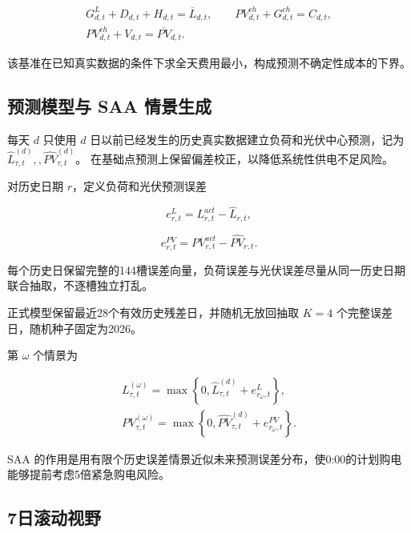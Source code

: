 \begin{equation}
\begin{gathered}
G^L_{d,t}+D_{d,t}+H_{d,t}=\overline L_{d,t},
\qquad
PV^{ch}_{d,t}+G^{ch}_{d,t}=C_{d,t},\\
PV^{ch}_{d,t}+V_{d,t}=\overline{PV}_{d,t}.
\end{gathered}
\end{equation}

该基准在已知真实数据的条件下求全天费用最小，构成预测不确定性成本的下界。

\subsection{预测模型与 SAA 情景生成}

每天 \(d\) 只使用 \(d\) 日以前已经发生的历史真实数据建立负荷和光伏中心预测，记为 \(\hat L_{\tau,t}^{(d)},, \widehat{PV}_{\tau,t}^{(d)}\)。 在基础点预测上保留偏差校正，以降低系统性供电不足风险。

对历史日期 \(r\)，定义负荷和光伏预测误差

\[
e^L_{r,t}
=
L_{r,t}^{act}
-
\hat L_{r,t},
\]

\begin{equation}
e^{PV}_{r,t}
=
PV_{r,t}^{act}
-
\widehat{PV}_{r,t}.
\end{equation}

每个历史日保留完整的144槽误差向量，负荷误差与光伏误差尽量从同一历史日期联合抽取，不逐槽独立打乱。

正式模型保留最近28个有效历史残差日，并随机无放回抽取 \(K=4\) 个完整误差日，随机种子固定为2026。

第 \(\omega\) 个情景为

\begin{equation}
\begin{gathered}
L_{\tau,t}^{(\omega)}
=
\max
\left\{
0,
\hat L_{\tau,t}^{(d)}
+
e^L_{r_\omega,t}
\right\},\\
PV_{\tau,t}^{(\omega)}
=
\max
\left\{
0,
\widehat{PV}_{\tau,t}^{(d)}
+
e^{PV}_{r_\omega,t}
\right\}.
\end{gathered}
\end{equation}

SAA 的作用是用有限个历史误差情景近似未来预测误差分布，使0:00的计划购电能够提前考虑5倍紧急购电风险。

\subsection{7日滚动视野}

